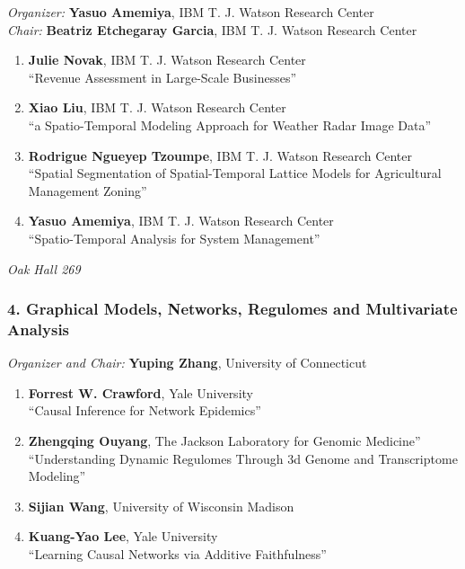 \emph{Organizer:} \textbf{Yasuo Amemiya}, IBM T. J. Watson Research Center \\
\emph{Chair:} \textbf{Beatriz Etchegaray Garcia}, IBM T. J. Watson Research Center

\begin{enumerate}
\item \textbf{Julie Novak}, IBM T. J. Watson Research Center \\
``Revenue Assessment in Large-Scale Businesses''
\item \textbf{Xiao Liu}, IBM T. J. Watson Research Center \\
``a Spatio-Temporal Modeling Approach for Weather Radar Image Data''
\item \textbf{Rodrigue Ngueyep Tzoumpe}, IBM T. J. Watson Research Center  \\
``Spatial Segmentation of Spatial-Temporal Lattice Models for Agricultural Management Zoning''
\item \textbf{Yasuo Amemiya}, IBM T. J. Watson Research Center \\
``Spatio-Temporal Analysis for System Management''
\end{enumerate}

\emph{Oak Hall 269} \\[.5em]

\subsubsection*{4. Graphical Models, Networks, Regulomes and Multivariate Analysis}

\emph{Organizer and Chair:} \textbf{Yuping Zhang}, University of Connecticut

\begin{enumerate}
\item \textbf{Forrest W. Crawford}, Yale University \\
``Causal Inference for Network Epidemics''
\item \textbf{Zhengqing Ouyang}, The Jackson Laboratory for Genomic Medicine” \\
``Understanding Dynamic Regulomes Through 3d Genome and Transcriptome Modeling''
\item \textbf{Sijian Wang}, University of Wisconsin Madison 
\item \textbf{Kuang-Yao Lee}, Yale University \\
``Learning Causal Networks via Additive Faithfulness''
\end{enumerate}

